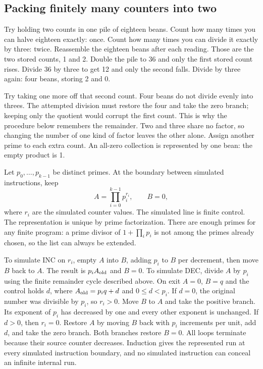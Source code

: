 \documentclass[11pt,twoside]{article}
\theoremstyle{thielethm}
\theoremstyle{thieledef}
\theoremstyle{thieledef}
\theoremstyle{thieledef}
\theoremstyle{thielethm}
\theoremstyle{thieleobs}
\theoremstyle{thielethm}
\begin{document}
\subsection{Packing finitely many counters into two}


Try holding two counts in one pile of eighteen beans. Count how many times you can
halve eighteen exactly: once. Count how many times you can divide it exactly by
three: twice. Reassemble the eighteen beans after each reading. Those are the two stored counts,
1 and 2. Double the pile to 36 and
only the first stored count rises. Divide 36 by three to get 12 and only the second
falls. Divide by three again: four beans, storing 2 and 0.

Try taking one more off that second count. Four beans do not divide evenly into
threes. The attempted division must restore the four and take the zero branch;
keeping only the quotient would corrupt the first count. This is why the procedure
below remembers the remainder. Two and three share no factor, so changing the
number of one kind of factor leaves the other alone. Assign another prime to
each extra count. An all-zero collection is represented by one bean: the empty
product is 1.

Let $p_0,\ldots,p_{k-1}$ be distinct primes. At the boundary between simulated
instructions, keep
\[
A=\prod_{i=0}^{k-1}p_i^{r_i},\qquad B=0,
\]
where $r_i$ are the simulated counter values. The simulated line is finite control.
The representation is unique by prime factorization. There are enough primes for
any finite program: a prime divisor of $1+\prod_i p_i$ is not among the primes already
chosen, so the list can always be extended.

To simulate INC on $r_i$, empty $A$ into $B$, adding $p_i$ to $B$ per decrement,
then move $B$ back to $A$. The result is $p_iA_{\rm old}$ and $B=0$.
To simulate DEC, divide $A$ by $p_i$ using the finite remainder cycle described above.
On exit $A=0$, $B=q$ and the control holds $d$, where $A_{\rm old}=p_iq+d$ and
$0\le d<p_i$. If $d=0$, the original number was divisible by $p_i$, so $r_i>0$.
Move $B$ to $A$ and take the positive branch. Its exponent of $p_i$ has decreased by
one and every other exponent is unchanged. If $d>0$, then $r_i=0$. Restore $A$ by
moving $B$ back with $p_i$ increments per unit, add $d$, and take the zero branch.
Both branches restore $B=0$. All loops terminate because their source counter decreases.
Induction gives the represented run at every simulated instruction boundary, and
no simulated instruction can conceal an infinite internal run.
\end{document}

